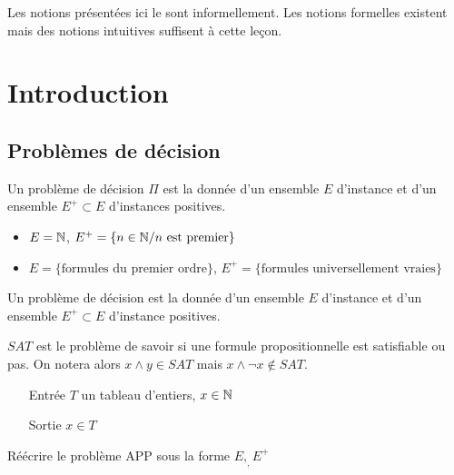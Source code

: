 
Les notions présentées ici le sont informellement. Les notions formelles existent mais des notions intuitives suffisent à cette leçon.

\section{Introduction}

\subsection{Problèmes de décision}

\begin{definition}
	Un problème de décision $\Pi$ est la donnée d'un ensemble $E$ d'instance et d'un ensemble $E^+\subset E$ d'instances positives.
\end{definition}

\begin{example}
	\begin{itemize}[label=$\bullet$]
		\item $E = \mathbb{N}$, $E^+ = \{n \in \mathbb{N} / n \text{ est premier}\}$
		\item $E = \{\text{formules du premier ordre}\}$, $E^+ =\{\text{formules universellement vraies}\}$
	\end{itemize}
\end{example}

\begin{personalise}[notation]
	Un problème de décision est la donnée d'un ensemble $E$ d'instance et d'un ensemble $E^+\subset E$ d'instance positives.
\end{personalise}


\begin{example}
	$SAT$ est le problème de savoir si une formule propositionnelle est satisfiable ou pas. On notera alors $x\wedge y \in SAT$ mais $x\wedge \neg x\notin SAT$.
\end{example}

\begin{example}
	\label{31-app}
	\begin{itemize}
		\item[Entrée] $T$ un tableau d'entiers, $x \in \mathbb{N}$
		\item[Sortie] $x \in T$
	\end{itemize}
\end{example}

\begin{exercise}
	Réécrire le problème APP sous la forme $E,_, E^+$
\end{exercise}

